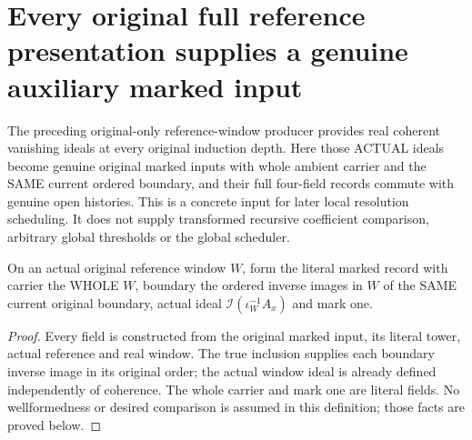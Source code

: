 \section{Every original full reference presentation supplies a genuine auxiliary marked input}

The preceding original-only reference-window producer provides real coherent
vanishing ideals at every original induction depth. Here those ACTUAL ideals
become genuine original marked inputs with whole ambient carrier and the
SAME current ordered boundary, and their full four-field records commute
with genuine open histories. This is a concrete input for later local
resolution scheduling. It does not supply transformed recursive coefficient
comparison, arbitrary global thresholds or the global scheduler.

\begin{definition}
\label{hir:original-full-reference-actual-auxiliary-marked-record}
\leanok
{}
On an actual original reference window $W$, form the literal marked record
with carrier the WHOLE $W$, boundary the ordered inverse images in $W$ of
the SAME current original boundary, actual ideal
$\mathcal I(\iota_W^{-1}A_x)$ and mark one.
\end{definition}
\begin{proof}
Every field is constructed from the original marked input, its literal tower,
actual reference and real window. The true inclusion supplies each boundary
inverse image in its original order; the actual window ideal is already
defined independently of coherence. The whole carrier and mark one are
literal fields. No wellformedness or desired comparison is assumed in this
definition; those facts are proved below.
\end{proof}

